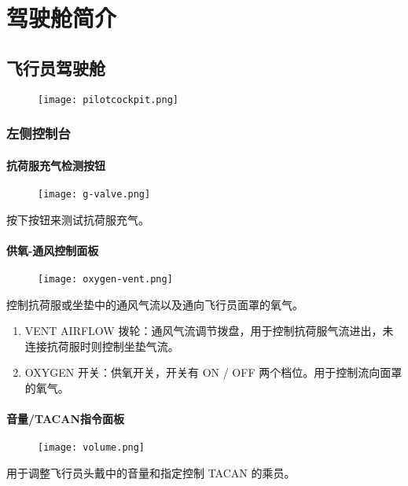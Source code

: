 
\chapter{驾驶舱简介}

\section{飞行员驾驶舱}

\begin{figure}[htb]
	\centering
	\texttt{[image: pilotcockpit.png]}
\end{figure}

\subsection{左侧控制台}

\subsubsection{抗荷服充气检测按钮}
\begin{figure}[htb]
	\centering
	\texttt{[image: g-valve.png]}
\end{figure}
按下按钮来测试抗荷服充气。

\subsubsection{供氧-通风控制面板}

\begin{figure}[htb]
	\centering
	\texttt{[image: oxygen-vent.png]}
\end{figure}
控制抗荷服或坐垫中的通风气流以及通向飞行员面罩的氧气。

\begin{enumerate}
	\item VENT AIRFLOW 拨轮：通风气流调节拨盘，用于控制抗荷服气流进出，未连接抗荷服时则控制坐垫气流。
	\item OXYGEN 开关：供氧开关，开关有 ON / OFF 两个档位。用于控制流向面罩的氧气。
\end{enumerate}

\subsubsection{音量/TACAN指令面板}

\begin{figure}[htb]
	\centering
	\texttt{[image: volume.png]}
\end{figure}
用于调整飞行员头戴中的音量和指定控制 TACAN 的乘员。

